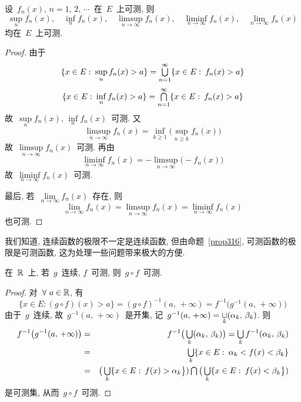 \begin{proposition} \label{prop316}
设~$f_n(x), \, n = 1,\,2,\,\cdots$~在~$E$~上可测, 则
\[
\sup_n f_n(x),\quad \inf_n f_n(x),\quad \limsup_{n \to \infty} f_n(x), \quad \liminf_{n \to \infty} f_n(x), \quad \lim_{n \to \infty} f_n(x)
\]
均在~$E$~上可测.
\end{proposition}

\begin{proof}
由于
\[
\{x \in E: \: \sup_n f_n(x) > a\} = \mathop{\textstyle{\bigcup}}_{n=1}^\infty \{x \in E: \: f_n(x) > a\}
\]
\[
\{x \in E: \: \inf_n f_n(x) > a\} = \mathop{\textstyle{\bigcap}}_{n=1}^\infty \{x \in E: \: f_n(x) > a\}
\]
故~$\sup\limits_n f_n(x),\, \inf\limits_n f_n(x)$~可测. 又
\[
\limsup_{n \to \infty} f_n(x) = \inf_{k \geqslant 1} \big( \sup_{n \geqslant k}f_n(x) \big)
\]
故~$\limsup\limits_{n \to \infty} f_n(x)$~可测. 再由
\[
\liminf_{n \to \infty} f_n(x) = -\limsup_{n \to \infty} \big( -f_n(x) \big)
\]
故~$\liminf\limits_{n \to \infty} f_n(x)$~可测.

最后, 若~$\lim\limits_{n \to \infty} f_n(x)$~存在, 则
\[
\lim_{n \to \infty} f_n(x) = \limsup_{n \to \infty} f_n(x) = \liminf_{n \to \infty} f_n(x)
\]
也可测.
\end{proof}

\begin{remark}
我们知道, 连续函数的极限不一定是连续函数, 但由命题~\ref{prop316}, 可测函数的极限是可测函数, 这为处理一些问题带来极大的方便.
\end{remark}

\begin{proposition}
在~$\mathbb{R}$~上, 若~$g$~连续, $f$~可测, 则~$g \circ f$~可测.
\end{proposition}

\begin{proof}
对~$\forall~a \in \mathbb{R}$, 有
\[
\{x \in E: (g \circ f) (x) > a\} = (g \circ f)^{-1}(a,\,+\infty) = f^{-1} \big( g^{-1} (a,\, +\infty) \big)
\]
由于~$g$~连续, 故~$g^{-1} (a,\, +\infty)$~是开集, 记~$g^{-1} (a,\, +\infty) = \mathop{\cup}\limits_{k} (\alpha_k,\,\beta_k)$. 则
\begin{eqnarray*}
f^{-1} \big( g^{-1} (a,\, +\infty) \big) &=& f^{-1} \big( \mathop{\textstyle{\bigcup}}_{k} (\alpha_k,\,\beta_k) \big) = \mathop{\textstyle{\bigcup}}_{k} f^{-1} (\alpha_k,\,\beta_k) \\
&=& \mathop{\textstyle{\bigcup}}_{k}\{x \in E: \: \alpha_k < f(x) < \beta_k\} \\
&=& \big( \mathop{\textstyle{\bigcup}}_{k}\{x \in E: \: f(x) > \alpha_k \big\}) \mathop{\textstyle{\bigcap}} \big( \mathop{\textstyle{\bigcup}}_{k}\{x \in E: \: f(x) < \beta_k \big\})
\end{eqnarray*}
是可测集, 从而~$g \circ f$~可测.
\end{proof}

